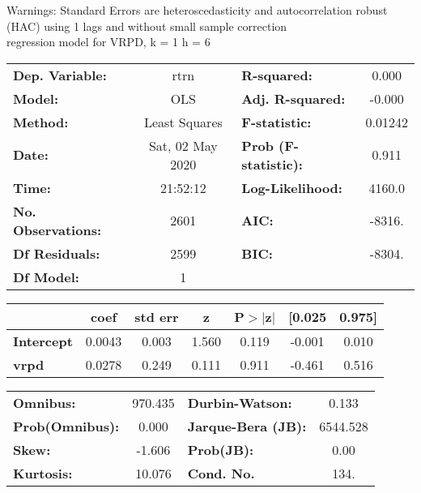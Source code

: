Warnings: \newline
 [1] Standard Errors are heteroscedasticity and autocorrelation robust (HAC) using 1 lags and without small sample correction\\ 

regression model for VRPD, k = 1 h = 6\begin{center}
\begin{tabular}{lclc}
\toprule
\textbf{Dep. Variable:}    &       rtrn       & \textbf{  R-squared:         } &     0.000   \\
\textbf{Model:}            &       OLS        & \textbf{  Adj. R-squared:    } &    -0.000   \\
\textbf{Method:}           &  Least Squares   & \textbf{  F-statistic:       } &   0.01242   \\
\textbf{Date:}             & Sat, 02 May 2020 & \textbf{  Prob (F-statistic):} &    0.911    \\
\textbf{Time:}             &     21:52:12     & \textbf{  Log-Likelihood:    } &    4160.0   \\
\textbf{No. Observations:} &        2601      & \textbf{  AIC:               } &    -8316.   \\
\textbf{Df Residuals:}     &        2599      & \textbf{  BIC:               } &    -8304.   \\
\textbf{Df Model:}         &           1      & \textbf{                     } &             \\
\bottomrule
\end{tabular}
\begin{tabular}{lcccccc}
                   & \textbf{coef} & \textbf{std err} & \textbf{z} & \textbf{P$> |$z$|$} & \textbf{[0.025} & \textbf{0.975]}  \\
\midrule
\textbf{Intercept} &       0.0043  &        0.003     &     1.560  &         0.119        &       -0.001    &        0.010     \\
\textbf{vrpd}      &       0.0278  &        0.249     &     0.111  &         0.911        &       -0.461    &        0.516     \\
\bottomrule
\end{tabular}
\begin{tabular}{lclc}
\textbf{Omnibus:}       & 970.435 & \textbf{  Durbin-Watson:     } &    0.133  \\
\textbf{Prob(Omnibus):} &   0.000 & \textbf{  Jarque-Bera (JB):  } & 6544.528  \\
\textbf{Skew:}          &  -1.606 & \textbf{  Prob(JB):          } &     0.00  \\
\textbf{Kurtosis:}      &  10.076 & \textbf{  Cond. No.          } &     134.  \\
\bottomrule
\end{tabular}
\end{center}

